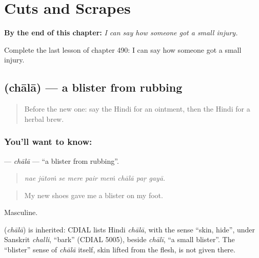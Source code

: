 
\chapter{Cuts and Scrapes}
\label{ch:hi-cuts-and-scrapes}

\begin{chapteropening}
\textbf{By the end of this chapter:} \emph{I can say how someone got a small injury.}

Complete the last lesson of chapter 490: I can say how someone got a small injury.
\end{chapteropening}

\section[\texorpdfstring{\hi{छाला} (chālā)}{छाला (chālā)}]{ (chālā) — a blister from rubbing}

\label{lesson:HI-C490-chala}



\begin{quote}
Before the new one: say the Hindi for an ointment, then the Hindi for a herbal brew.
\end{quote}

\subsection*{You'll want to know: }
\textbf{} — \emph{chālā} — \textquotedblleft{}a blister from rubbing\textquotedblright{}.

\begin{quote}
        
\end{quote}

\begin{quote}
\emph{nae jūtoṁ se mere pair meṁ chālā paṛ gayā.}
\end{quote}

\begin{quote}
My new shoes gave me a blister on my foot.
\end{quote}

Masculine.

\begin{cousinweb}
\textbf{} (\emph{chālā}) is inherited: CDIAL lists Hindi \emph{chālā}, with the sense \textquotedblleft{}skin, hide\textquotedblright{}, under Sanskrit \emph{challi}, \textquotedblleft{}bark\textquotedblright{} (CDIAL 5005), beside \emph{chālī}, \textquotedblleft{}a small blister\textquotedblright{}. The \textquotedblleft{}blister\textquotedblright{} sense of \emph{chālā} itself, skin lifted from the flesh, is not given there.
\end{cousinweb}

